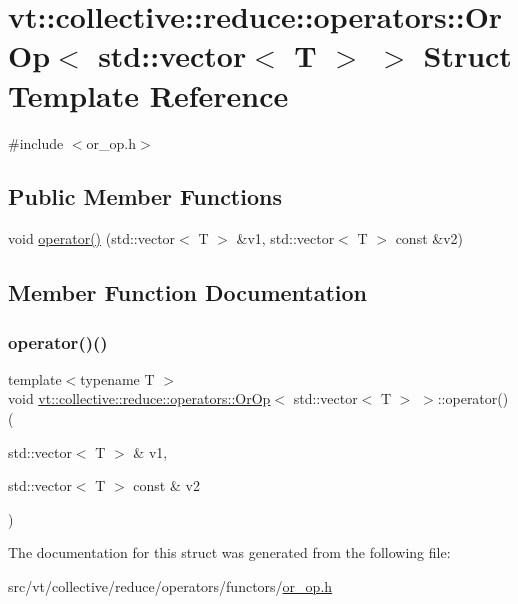\hypertarget{structvt_1_1collective_1_1reduce_1_1operators_1_1_or_op_3_01std_1_1vector_3_01_t_01_4_01_4}{}\section{vt\+:\+:collective\+:\+:reduce\+:\+:operators\+:\+:Or\+Op$<$ std\+:\+:vector$<$ T $>$ $>$ Struct Template Reference}
\label{structvt_1_1collective_1_1reduce_1_1operators_1_1_or_op_3_01std_1_1vector_3_01_t_01_4_01_4}


{\ttfamily \#include $<$or\+\_\+op.\+h$>$}

\subsection*{Public Member Functions}
\begin{DoxyCompactItemize}
\item 
void \hyperlink{structvt_1_1collective_1_1reduce_1_1operators_1_1_or_op_3_01std_1_1vector_3_01_t_01_4_01_4_a2fd20397bd432c61f132a26f0e4bb561}{operator()} (std\+::vector$<$ T $>$ \&v1, std\+::vector$<$ T $>$ const \&v2)
\end{DoxyCompactItemize}


\subsection{Member Function Documentation}
\mbox{\label{structvt_1_1collective_1_1reduce_1_1operators_1_1_or_op_3_01std_1_1vector_3_01_t_01_4_01_4_a2fd20397bd432c61f132a26f0e4bb561}} 
\subsubsection{\texorpdfstring{operator()()}{operator()()}}
{\footnotesize\ttfamily template$<$typename T $>$ \\
void \hyperlink{structvt_1_1collective_1_1reduce_1_1operators_1_1_or_op}{vt\+::collective\+::reduce\+::operators\+::\+Or\+Op}$<$ std\+::vector$<$ T $>$ $>$\+::operator() (\begin{DoxyParamCaption}\item[{std\+::vector$<$ T $>$ \&}]{v1,  }\item[{std\+::vector$<$ T $>$ const \&}]{v2 }\end{DoxyParamCaption})\hspace{0.3cm}{\ttfamily [inline]}}



The documentation for this struct was generated from the following file\+:\begin{DoxyCompactItemize}
\item 
src/vt/collective/reduce/operators/functors/\hyperlink{or__op_8h}{or\+\_\+op.\+h}\end{DoxyCompactItemize}

